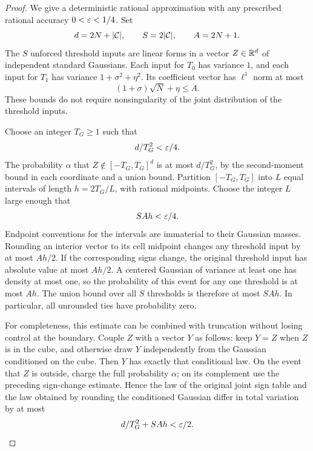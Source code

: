 \begin{proof}
We give a deterministic rational approximation with any prescribed rational
accuracy $0<\varepsilon<1/4$. Set
\[
 d=2N+|\mathcal C|,\qquad S=2|\mathcal C|,\qquad A=2N+1.
\]
The $S$ unforced threshold inputs are linear forms in a vector
$Z\in\mathbb R^d$ of independent standard Gaussians. Each input for $T_0$ has
variance $1$, and each input for $T_1$ has variance
$1+\sigma^2+\eta^2$. Its coefficient vector has $\ell^1$ norm at most
\[
 (1+\sigma)\sqrt N+\eta\le A.
\]
These bounds do not require nonsingularity of the joint distribution of
the threshold inputs.

Choose an integer $T_G\ge1$ such that
\[
 d/T_G^2<\varepsilon/4.
\]
The probability $\alpha$ that $Z\notin[-T_G,T_G]^d$ is at most $d/T_G^2$,
by the second-moment bound in each coordinate and a union bound. Partition
$[-T_G,T_G]$ into $L$ equal intervals of length $h=2T_G/L$, with rational
midpoints. Choose the integer $L$ large enough that
\begin{equation}\label{eq:gaussian-mesh-choice}
 SAh<\varepsilon/4.
\end{equation}
Endpoint conventions for the intervals are immaterial to their Gaussian
masses. Rounding an interior vector to its cell midpoint changes any
threshold input by at most $Ah/2$. If the corresponding signs change,
the original threshold input has absolute value at most $Ah/2$.
A centered Gaussian of variance at least one has density at most one,
so the probability of this event for any one threshold is at most $Ah$.
The union bound over all $S$ thresholds is therefore at most $SAh$.
In particular, all unrounded ties have probability zero.

For completeness, this estimate can be combined with truncation without
losing control at the boundary. Couple $Z$ with a vector $Y$ as follows:
keep $Y=Z$ when $Z$ is in the cube, and otherwise draw $Y$ independently
from the Gaussian conditioned on the cube. Then $Y$ has exactly that
conditional law. On the event that $Z$ is outside, charge the full
probability $\alpha$; on its complement use the preceding sign-change
estimate. Hence the law of the original joint sign table and the law
obtained by rounding the conditioned Gaussian differ in total variation
by at most
\begin{equation}\label{eq:tail-and-grid-error}
 d/T_G^2+SAh<\varepsilon/2.
\end{equation}


\end{proof}
